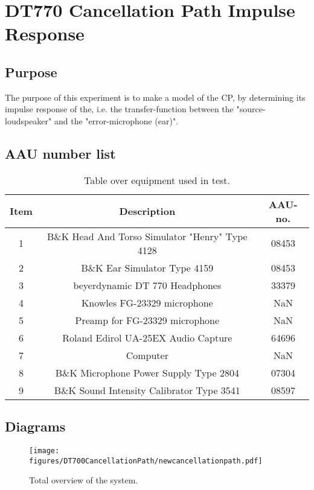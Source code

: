 \section{DT770 Cancellation Path Impulse Response} \label{sec:DT770CPjournal}
\subsection{Purpose}
The purpose of this experiment is to make a model of the CP, by determining its impulse response of the, i.e. the transfer-function between the "source-loudspeaker" and the "error-microphone (ear)".
		
\subsection{AAU number list}
\begin{table}[h]
	\centering
	\begin{tabular}{ c c c } \toprule
		{Item}	& {Description} 						& {AAU-no}. \\ \bottomrule 
		1	&	B\&K Head And Torso Simulator "Henry" Type 4128	& 08453		\\
		2	&	B\&K Ear Simulator Type 4159			& 08453		\\
		3	&	beyerdynamic DT 770	Headphones			& 33379		\\
		4	&	Knowles FG-23329 microphone					& NaN		\\
		5	&	Preamp for FG-23329  microphone	& NaN\\
		6	&	Roland Edirol UA-25EX Audio Capture		& 64696			\\
		7	&	Computer					& NaN		\\
		8	&	B\&K Microphone Power Supply Type 2804 	& 07304		\\
		9	&	B\&K Sound Intensity Calibrator Type 3541	& 08597	\\ \bottomrule
	\end{tabular}
	\caption{Table over equipment used in test.}
	\label{tab:UsedEquipmentListningCP}
\end{table}

\subsection{Diagrams}
\begin{figure}[H]
	\centering
	\texttt{[image: figures/DT700CancellationPath/newcancellationpath.pdf]}
	\caption{Total overview of the system.}
	\label{SchematicOverviewCP}
\end{figure}

